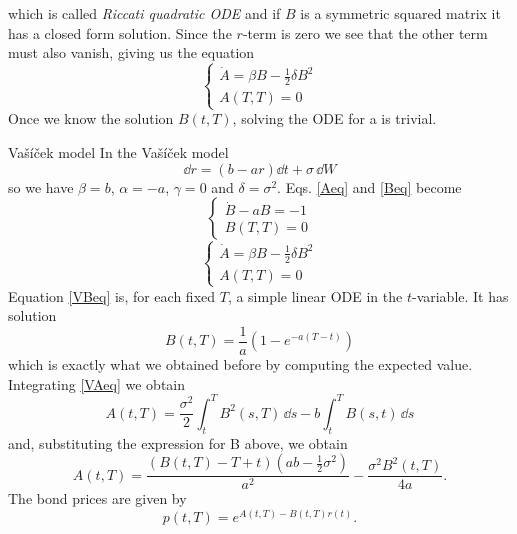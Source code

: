 which is called \emph{Riccati quadratic ODE} and if $B$ is a symmetric squared matrix it has a closed form solution.
Since the $r$-term is zero we see that the other term must also vanish,
giving us the equation
\begin{equation}\label{Beq}
    \begin{cases}
    \dot{A} = \beta B - \frac{1}{2}\delta B^2 \\
    A(T,T) = 0
    \end{cases}
\end{equation}
Once we know the solution $B(t,T)$, solving the ODE for a is trivial.
\begin{example}{Vašíček model}{}{} %
    In the Vašíček model
    \begin{equation*}
        \dd r = (b - ar)\dd t + \sigma\,\dd W
    \end{equation*}
    so we have $\beta = b$, $\alpha = -a$, $\gamma = 0$ and $\delta = \sigma^2$. Eqs. \eqref{Aeq} and \eqref{Beq} become
    \begin{equation}
    \begin{cases}\label{VBeq}
        \dot{B} - aB = -1 \\
        B(T,T) = 0
    \end{cases}
    \end{equation}
    \begin{equation}
    \begin{cases}\label{VAeq}
    \dot{A} = \beta B - \frac{1}{2}\delta B^2 \\
    A(T,T) = 0
    \end{cases}
    \end{equation}
    Equation \eqref{VBeq} is, for each fixed $T$, a simple linear ODE in the $t$-variable. It has solution
    \begin{equation*}
        B(t,T) = \frac{1}{a}\left(1-e^{-a(T-t)}\right)
    \end{equation*}
    which is exactly what we obtained before by computing the expected value. Integrating \eqref{VAeq} we obtain
    \begin{equation*}
        A(t,T) = \frac{\sigma^2}{2}\int_t^T B^2(s,T)\,\dd s - b\int_t^T B(s,t)\,\dd s
    \end{equation*}
    and, substituting the expression for B above, we obtain
    \begin{equation*}
        A(t,T) = \frac{(B(t,T)-T+t)(ab-\tfrac{1}{2}\sigma^2)}{a^2} - \frac{\sigma^2 B^2(t,T)}{4a}.
    \end{equation*}
    The bond prices are given by
    \begin{equation*}
        p(t,T) = e^{A(t,T)-B(t,T)r(t)}.
    \end{equation*}
\end{example}
